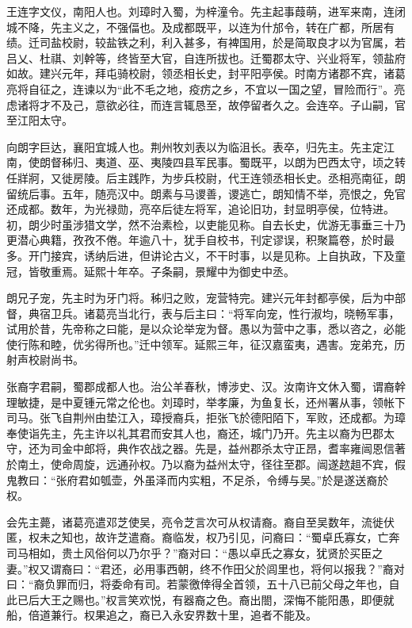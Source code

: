 \documentclass[12pt,UTF8]{ctexbook}
\begin{document}
王连字文仪，南阳人也。刘璋时入蜀，为梓潼令。先主起事葭萌，进军来南，连闭城不降，先主义之，不强偪也。及成都既平，以连为什邡令，转在广都，所居有绩。迁司盐校尉，较盐铁之利，利入甚多，有裨国用，於是简取良才以为官属，若吕乂、杜祺、刘幹等，终皆至大官，自连所拔也。迁蜀郡太守、兴业将军，领盐府如故。建兴元年，拜屯骑校尉，领丞相长史，封平阳亭侯。时南方诸郡不宾，诸葛亮将自征之，连谏以为“此不毛之地，疫疠之乡，不宜以一国之望，冒险而行”。亮虑诸将才不及己，意欲必往，而连言辄恳至，故停留者久之。会连卒。子山嗣，官至江阳太守。

向朗字巨达，襄阳宜城人也。荆州牧刘表以为临沮长。表卒，归先主。先主定江南，使朗督秭归、夷道、巫、夷陵四县军民事。蜀既平，以朗为巴西太守，顷之转任牂牁，又徙房陵。后主践阼，为步兵校尉，代王连领丞相长史。丞相亮南征，朗留统后事。五年，随亮汉中。朗素与马谡善，谡逃亡，朗知情不举，亮恨之，免官还成都。数年，为光禄勋，亮卒后徒左将军，追论旧功，封显明亭侯，位特进。初，朗少时虽涉猎文学，然不治素检，以吏能见称。自去长史，优游无事垂三十乃更潜心典籍，孜孜不倦。年逾八十，犹手自校书，刊定谬误，积聚篇卷，於时最多。开门接宾，诱纳后进，但讲论古义，不干时事，以是见称。上自执政，下及童冠，皆敬重焉。延熙十年卒。子条嗣，景耀中为御史中丞。

朗兄子宠，先主时为牙门将。秭归之败，宠营特完。建兴元年封都亭侯，后为中部督，典宿卫兵。诸葛亮当北行，表与后主曰：“将军向宠，性行淑均，晓畅军事，试用於昔，先帝称之曰能，是以众论举宠为督。愚以为营中之事，悉以咨之，必能使行陈和睦，优劣得所也。”迁中领军。延熙三年，征汉嘉蛮夷，遇害。宠弟充，历射声校尉尚书。

张裔字君嗣，蜀郡成都人也。治公羊春秋，博涉史、汉。汝南许文休入蜀，谓裔幹理敏捷，是中夏锺元常之伦也。刘璋时，举孝廉，为鱼复长，还州署从事，领帐下司马。张飞自荆州由垫江入，璋授裔兵，拒张飞於德阳陌下，军败，还成都。为璋奉使诣先主，先主许以礼其君而安其人也，裔还，城门乃开。先主以裔为巴郡太守，还为司金中郎将，典作农战之器。先是，益州郡杀太守正昂，耆率雍闿恩信著於南土，使命周旋，远通孙权。乃以裔为益州太守，径往至郡。闿遂趑趄不宾，假鬼教曰：“张府君如瓠壶，外虽泽而内实粗，不足杀，令缚与吴。”於是遂送裔於权。

会先主薨，诸葛亮遣邓芝使吴，亮令芝言次可从权请裔。裔自至吴数年，流徙伏匿，权未之知也，故许芝遣裔。裔临发，权乃引见，问裔曰：“蜀卓氏寡女，亡奔司马相如，贵土风俗何以乃尔乎？”裔对曰：“愚以卓氏之寡女，犹贤於买臣之妻。”权又谓裔曰：“君还，必用事西朝，终不作田父於闾里也，将何以报我？”裔对曰：“裔负罪而归，将委命有司。若蒙徼倖得全首领，五十八已前父母之年也，自此已后大王之赐也。”权言笑欢悦，有器裔之色。裔出閤，深悔不能阳愚，即便就船，倍道兼行。权果追之，裔已入永安界数十里，追者不能及。
\end{document}
